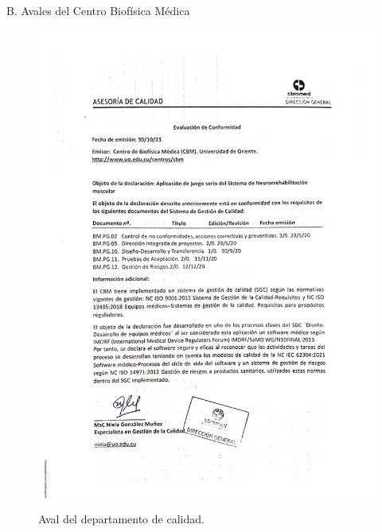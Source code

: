 \begin{annexes}{B. Avales del Centro Biofísica Médica}
    \begin{figure}[!ht]
        \centering
        \includegraphics[scale=0.3]{images/annexes/aval - calidad del softw.jpg}
        \caption{Aval del departamento de calidad.}
        \label{annex: qualitydepartment}
    \end{figure}
\end{annexes}